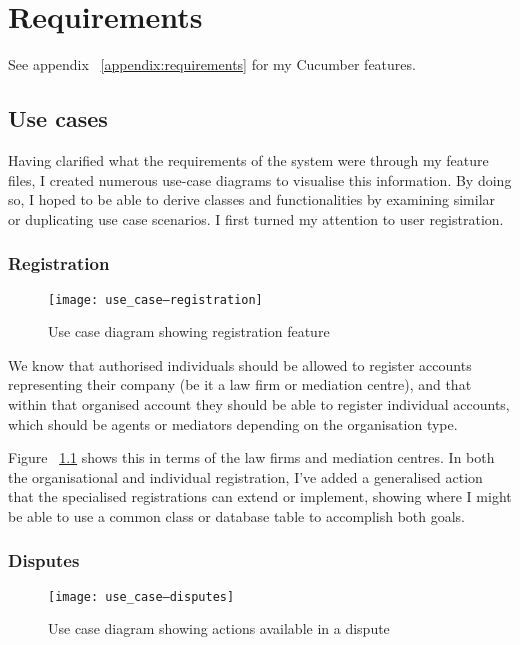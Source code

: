 \chapter{Requirements}

See appendix ~\ref{appendix:requirements} for my Cucumber features.

\section{Use cases}

Having clarified what the requirements of the system were through my feature files, I created numerous use-case diagrams to visualise this information. By doing so, I hoped to be able to derive classes and functionalities by examining similar or duplicating use case scenarios. I first turned my attention to user registration.

\subsection{Registration}

\begin{figure}[h!]
  \centering
    \texttt{[image: use\_case--registration]}
  \caption{Use case diagram showing registration feature}
  \label{uml:useCase:registration}
\end{figure}

We know that authorised individuals should be allowed to register accounts representing their company (be it a law firm or mediation centre), and that within that organised account they should be able to register individual accounts, which should be agents or mediators depending on the organisation type.

Figure ~\ref{uml:useCase:registration} shows this in terms of the law firms and mediation centres. In both the organisational and individual registration, I've added a generalised action that the specialised registrations can extend or implement, showing where I might be able to use a common class or database table to accomplish both goals.

\subsection{Disputes}

\begin{figure}[h!]
  \centering
    \texttt{[image: use\_case--disputes]}
  \caption{Use case diagram showing actions available in a dispute}
  \label{uml:useCase:disputes}
\end{figure}

